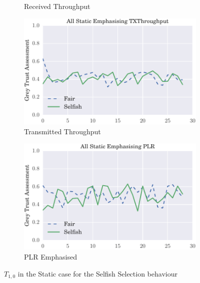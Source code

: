 \documentclass[runningheads,a4paper]{llncs}
\begin{document}
{{\begin{figure}
\begin{subfigure}{0.5\textwidth}
  \caption{Received Throughput}
  \label{fig:beta_trust_all_mobile}
\end{subfigure}
\begin{subfigure}{0.5\textwidth}
\centering
  \includegraphics[width=.8\linewidth]{img/trust_bella_static_emph_TXThroughput_SelfishTargetSelection.pdf}
  \caption{Transmitted Throughput}
  \label{fig:beta_trust_all_mobile}
\end{subfigure}
\begin{subfigure}{0.5\textwidth}
\centering
  \includegraphics[width=.8\linewidth]{img/trust_bella_static_emph_PLR_SelfishTargetSelection.pdf}
  \caption{PLR Emphasised}
  \label{fig:beta_trust_all_mobile}
\end{subfigure}
\caption{$T_{1,0}$ in the Static case for the Selfish Selection behaviour}
\label{fig:trust_mobility}
\end{figure}

}}
\end{document}
